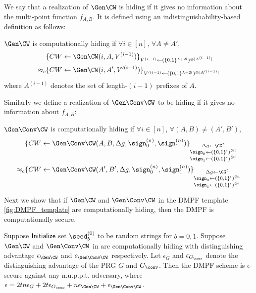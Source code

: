 We say that a realization of $\Gen\CW$ is hiding if it gives no information about the multi-point function $f_{A,B}$. It is defined using an indistinguishability-based definition as follows: 
\begin{definition}\label{def:GenCW_hiding}
    $\Gen\CW$ is computationally hiding if $\forall i\in[n]$, $\forall A\not=A'$,
    \[
        \begin{split}
            &\{CW\gets \Gen\CW(i,A,V^{(i-1)})\}_{V^{(i-1)}\gets(\{0,1\}^{\lambda+2l})^{\otimes |A^{(i-1)}|}}\\\approx_c&\{CW\gets \Gen\CW(i,A',V'^{(i-1)})\}_{V'^{(i-1)}\gets(\{0,1\}^{\lambda+2l})^{\otimes |A'^{(i-1)}|}}
        \end{split}
    \]
    where $A^{(i-1)}$ denotes the set of length-$(i-1)$ prefixes of $A$. 
\end{definition}
Similarly we define a realization of $\Gen\Conv\CW$ to be hiding if it gives no information about $f_{A,B}$: 
\begin{definition}\label{def:GenConvCW_hiding}
    $\,$\\$\Gen\Conv\CW$ is computationally hiding if $\forall i\in[n]$, $\forall (A,B)\not=(A',B')$, 
    \[
        \begin{split}
            &\{CW\gets \Gen\Conv\CW(A,B,\Delta g, \sign_0^{(n)}, \sign_1^{(n)})\}_{\substack{
                \Delta g\gets \GG^t\\\sign_0\gets (\{0,1\}^l)^{\otimes t}\\\sign_1\gets (\{0,1\}^l)^{\otimes t}}}\\\approx_c&\{CW\gets \Gen\Conv\CW(A',B',\Delta g, \sign_0^{(n)}, \sign_1^{(n)})\}_{\substack{
                    \Delta g\gets \GG^t\\\sign_0\gets (\{0,1\}^l)^{\otimes t}\\\sign_1\gets (\{0,1\}^l)^{\otimes t}}}
        \end{split}
    \]
\end{definition}
Next we show that if $\Gen\CW$ and $\Gen\Conv\CW$ in the DMPF template \cref{fig:DMPF_template} are computationally hiding, then the DMPF is computationally secure. 
\begin{lemma}\label{lem:template_secure}
    Suppose ${\sf Initialize}$ set $\seed_b^{(0)}$ to be random strings for $b=0,1$. Suppose  $\Gen\CW$ and $\Gen\Conv\CW$ in  are computationally hiding with distinguishing advantage $\epsilon_{\Gen\CW}$ and $\epsilon_{\Gen\Conv\CW}$ respectively. Let $\epsilon_G$ and $\epsilon_{G_\conv}$ denote the distinguishing advantage of the PRG $G$ and $G_\conv$. Then the DMPF scheme is $\epsilon$-secure against any n.u.p.p.t. adversary, where $\epsilon = 2tn\epsilon_{G}+2t \epsilon_{G_\conv}+n\epsilon_{\Gen\CW} +\epsilon_{\Gen\Conv\CW}$. 
\end{lemma}
